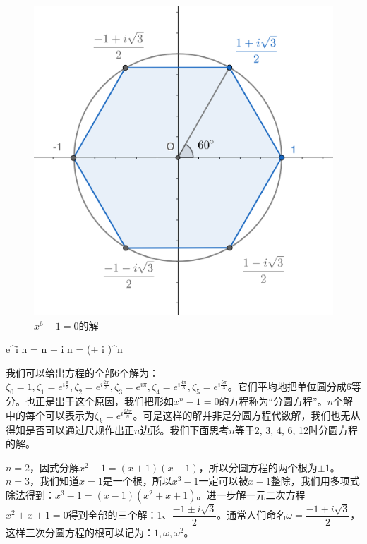 \documentclass[b5paper]{ctexart}
\begin{document}
\begin{figure}[htbp]
 \centering
 \includegraphics[scale=2]{img/cyclotomic-6.png}
 \caption{$x^6 - 1 = 0$的解}
 \label{fig:cyclotomic-6}
\end{figure}

\be
e^{i n \theta} = \cos n \theta + i \sin n \theta = (\cos \theta + i \sin \theta)^n
\ee

我们可以给出方程的全部6个解为：$\zeta_0 = 1, \zeta_1 = e^{i\frac{\pi}{3}}, \zeta_2 = e^{i\frac{2\pi}{3}}, \zeta_3 = e^{i\pi}, \zeta_4 = e^{i\frac{4\pi}{3}}, \zeta_5 = e^{i\frac{5\pi}{3}}$。它们平均地把单位圆分成6等分。也正是出于这个原因，我们把形如$x^n - 1 = 0$的方程称为“分圆方程”。$n$个解中的每个可以表示为$\zeta_k = e^{i\frac{2k\pi}{n}}$。可是这样的解并非是分圆方程代数解，我们也无从得知是否可以通过尺规作出正$n$边形。我们下面思考$n$等于2, 3, 4, 6, 12时分圆方程的解。

$n = 2$，因式分解$x^2 - 1 = (x + 1)(x - 1)$，所以分圆方程的两个根为$\pm 1$。$n=3$，我们知道$x = 1$是一个根，所以$x^3 - 1$一定可以被$x - 1$整除，我们用多项式除法得到：$x^3 - 1 = (x - 1)(x^2 + x + 1)$。进一步解一元二次方程$x^2 + x + 1 = 0$得到全部的三个解：1、$\dfrac{-1 \pm i \sqrt{3}}{2}$。通常人们命名$\omega = \dfrac{-1 + i \sqrt{3}}{2}$，这样三次分圆方程的根可以记为：$1, \omega, \omega^2$。
\end{document}
